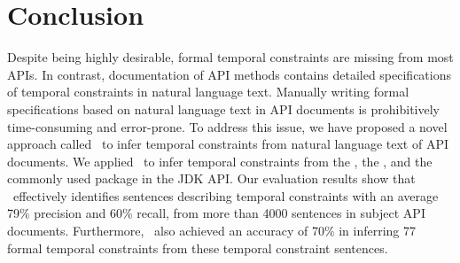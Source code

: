 \section{Conclusion}
\label{sec:conclusion}

Despite being highly desirable, formal temporal constraints are missing from most APIs.
In contrast, documentation of API methods contains detailed specifications of temporal constraints in natural language text.
Manually writing formal specifications based on natural language text in API documents is prohibitively time-consuming and error-prone.
To address this issue, we have proposed a novel approach called \tool\ to infer temporal constraints from natural language text of API documents.
We applied \tool\ to infer temporal constraints from
the \paypalAPI, the \amazonAPI, and the 
commonly used package  in the JDK API.
Our evaluation results show that \tool\ effectively identifies sentences describing
temporal constraints with an average 79\% precision and 60\% recall,
from more than 4000 sentences in subject API documents.
Furthermore, \tool\ also achieved an accuracy of
70\% in inferring 77 formal temporal constraints from these temporal constraint sentences.